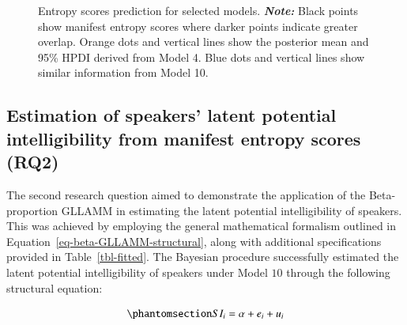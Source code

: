 \documentclass[
  authoryear,
  preprint,
  1p]{elsarticle}
\begin{document}
\label{cell-fig-rq1-pred-speaker}
\begin{figure}[H]


\caption{\label{fig-rq1-pred-speaker}Entropy scores prediction for
selected models. \textbf{\emph{Note:}} Black points show manifest
entropy scores where darker points indicate greater overlap. Orange dots
and vertical lines show the posterior mean and 95\% HPDI derived from
Model 4. Blue dots and vertical lines show similar information from
Model 10.}

\end{figure}%

\subsection{Estimation of speakers' latent potential intelligibility
from manifest entropy scores (RQ2)}\label{sec-R-RQ2}

The second research question aimed to demonstrate the application of the
Beta-proportion GLLAMM in estimating the latent potential
intelligibility of speakers. This was achieved by employing the general
mathematical formalism outlined in
Equation~\ref{eq-beta-GLLAMM-structural}, along with additional
specifications provided in Table~\ref{tbl-fitted}. The Bayesian
procedure successfully estimated the latent potential intelligibility of
speakers under Model \(10\) through the following structural equation:

\begin{equation}\phantomsection\label{eq-beta-GLLAMM-structural-model10}{
SI_{i} = \alpha + e_{i} + u_{i}
}\end{equation}
\end{document}
